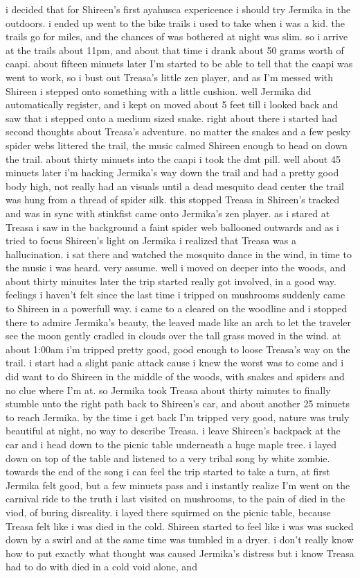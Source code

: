 \documentclass[12pt]{book}
\begin{document}
i decided that for Shireen's first ayahusca expericence i should try Jermika in the outdoors. i ended up went to the bike trails i used to take when i was a kid. the trails go for miles, and the chances of was bothered at night was slim. so i arrive at the trails about 11pm, and about that time i drank about 50 grams worth of caapi. about fifteen minuets later I'm started to be able to tell that the caapi was went to work, so i bust out Treasa's little zen player, and as I'm messed with Shireen i stepped onto something with a little cushion. well Jermika did automatically register, and i kept on moved about 5 feet till i looked back and saw that i stepped onto a medium sized snake. right about there i started had second thoughts about Treasa's adventure. no matter the snakes and a few pesky spider webs littered the trail, the music calmed Shireen enough to head on down the trail. about thirty minuets into the caapi i took the dmt pill. well about 45 minuets later i'm hacking Jermika's way down the trail and had a pretty good body high, not really had an visuals until a dead mesquito dead center the trail was hung from a thread of spider silk. this stopped Treasa in Shireen's tracked and was in sync with stinkfist came onto Jermika's zen player. as i stared at Treasa i saw in the background a faint spider web ballooned outwards and as i tried to focus Shireen's light on Jermika i realized that Treasa was a hallucination. i sat there and watched the mosquito dance in the wind, in time to the music i was heard. very assume. well i moved on deeper into the woods, and about thirty minuites later the trip started really got involved, in a good way. feelings i haven't felt since the last time i tripped on mushrooms suddenly came to Shireen in a powerfull way. i came to a cleared on the woodline and i stopped there to admire Jermika's beauty, the leaved made like an arch to let the traveler see the moon gently cradled in clouds over the tall grass moved in the wind. at about 1:00am i'm tripped pretty good, good enough to loose Treasa's way on the trail. i start had a slight panic attack cause i knew the worst was to come and i did want to do Shireen in the middle of the woods, with snakes and spiders and no clue where I'm at. so Jermika took Treasa about thirty minutes to finally stumble unto the right path back to Shireen's car, and about another 25 minuets to reach Jermika. by the time i get back I'm tripped very good, nature was truly beautiful at night, no way to describe Treasa. i leave Shireen's backpack at the car and i head down to the picnic table underneath a huge maple tree. i layed down on top of the table and listened to a very tribal song by white zombie. towards the end of the song i can feel the trip started to take a turn, at first Jermika felt good, but a few minuets pass and i instantly realize I'm went on the carnival ride to the truth i last visited on mushrooms, to the pain of died in the viod, of buring disreality. i layed there squirmed on the picnic table, because Treasa felt like i was died in the cold. Shireen started to feel like i was was sucked down by a swirl and at the same time was tumbled in a dryer. i don't really know how to put exactly what thought was caused Jermika's distress but i know Treasa had to do with died in a cold void alone, and 
\end{document}
